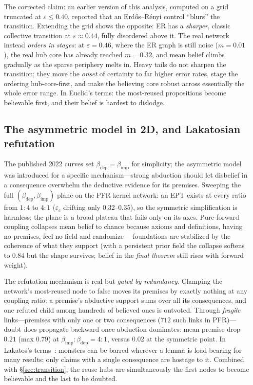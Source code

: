 \documentclass[11pt]{article}
\newcommand{\eps}{\varepsilon}
\newcommand{\betadep}{\beta_{\mathrm{dep}}}
\newcommand{\betaimp}{\beta_{\mathrm{imp}}}
\begin{document}
The corrected claim: an earlier version of this analysis, computed on a grid truncated at
$\eps \le 0.40$, reported that an Erd\H{o}s--R\'enyi control ``blurs'' the transition. Extending
the grid shows the opposite: ER has a \emph{sharper}, classic collective transition at
$\eps \approx 0.44$, fully disordered above it. The real network instead \emph{orders in
stages}: at $\eps = 0.46$, where the ER graph is still noise ($m = 0.01$), the real hub core has
already reached $m = 0.32$, and mean belief climbs gradually as the sparse periphery melts in.
Heavy tails do not sharpen the transition; they move the \emph{onset} of certainty to far higher
error rates, stage the ordering hub-core-first, and make the believing core robust across
essentially the whole error range. In Euclid's terms: the most-reused propositions become
believable first, and their belief is hardest to dislodge.

\subsection{The asymmetric model in 2D, and Lakatosian refutation}
\label{sec:asym}

The published 2022 curves set $\betadep = \betaimp$ for simplicity; the asymmetric model was
introduced for a specific mechanism---strong abduction should let disbelief in a consequence
overwhelm the deductive evidence for its premises. Sweeping the full $(\betadep, \betaimp)$
plane on the PFR kernel network: an EPT exists at every ratio from $1{:}4$ to $4{:}1$
($\eps_c$ drifting only $0.32$--$0.35$), so the symmetric simplification is harmless; the plane
is a broad plateau that fails only on its axes. Pure-forward coupling collapses mean belief to
chance because axioms and definitions, having no premises, feel no field and randomize---%
foundations are stabilized by the coherence of what they support (with a persistent prior field
the collapse softens to $0.84$ but the shape survives; belief in the \emph{final theorem} still
rises with forward weight).

The refutation mechanism is real but \emph{gated by redundancy}. Clamping the network's
most-reused node to false moves its premises by exactly nothing at any coupling ratio: a
premise's abductive support sums over all its consequences, and one refuted child among
hundreds of believed ones is outvoted. Through \emph{fragile} links---premises with only one or
two consequences ($712$ such links in PFR)---doubt does propagate backward once abduction
dominates: mean premise drop $0.21$ (max $0.79$) at $\betaimp{:}\betadep = 4{:}1$, versus
$0.02$ at the symmetric point. In Lakatos's terms~\cite{lakatos1976}: monsters can be barred
wherever a lemma is load-bearing for many results; only claims with a single consequence are
hostage to it. Combined with \S\ref{sec:transition}, the reuse hubs are simultaneously the
first nodes to become believable and the last to be doubted.
\end{document}

